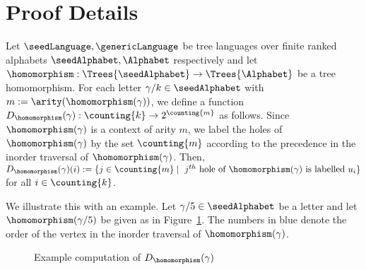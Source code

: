 \section{Proof Details}\label{sec:proofDetails}

\begin{definition}\label{def:destinationFunction}
    Let $\seedLanguage, \genericLanguage$ be tree languages over finite ranked alphabets $\seedAlphabet, \Alphabet$ respectively and let $\homomorphism : \Trees{\seedAlphabet} \to \Trees{\Alphabet}$ be a tree homomorphism. For each letter $\gamma/k \in \seedAlphabet$ with $m := \arity(\homomorphism(\gamma))$, we define a function $D_{\homomorphism}(\gamma) : \counting{k} \to 2^{\counting{m}}$ as follows. Since $\homomorphism(\gamma)$ is a context of arity $m$, we label the holes of $\homomorphism(\gamma)$ by the set $\counting{m}$ according to the precedence in the inorder traversal of $\homomorphism(\gamma)$. Then, $D_{\homomorphism}(\gamma)(i) := \{j \in \counting{m} \mid \mbox{ $j^{th}$ hole of $\homomorphism(\gamma)$ is labelled $u_i$}\}$ for all $i \in \counting{k}$. 
\end{definition}

We illustrate this with an example. Let $\gamma/5 \in \seedAlphabet$ be a letter and let $\homomorphism(\gamma/5)$ be given as in Figure~\ref{fig:destinationFunctionExample}. The numbers in blue denote the order of the vertex in the inorder traversal of $\homomorphism(\gamma)$.

\begin{figure}
    \caption{Example computation of $D_{\homomorphism}(\gamma)$}\label{fig:destinationFunctionExample}
\end{figure}

